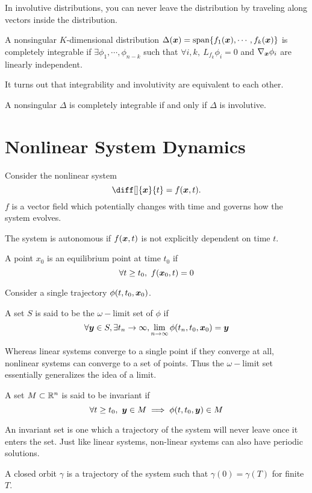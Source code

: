 In involutive distributions, you can never leave the distribution by traveling
along vectors inside the distribution.
\begin{definition}
	A nonsingular $K$-dimensional distribution $\Delta(\boldsymbol{x}) =
	\text{span}\{f_1(\boldsymbol{x}), \cdots, f_k(\boldsymbol{x})\}$ is completely integrable if
	$\exists \phi_1,\cdots,\phi_{n-k}$ such that $\forall i,k,\ L_{f_k}\phi_i = 0$
	and $\nabla_{\boldsymbol{x}}\phi_i$ are linearly independent.
	\label{thm:involutive}
\end{definition}
It turns out that integrability and involutivity are equivalent to each other.
\begin{theorem}
	A nonsingular $\Delta$ is completely integrable if and only if $\Delta$ is
	involutive.
	\label{thm:frobenius}
\end{theorem}
\section{Nonlinear System Dynamics}
Consider the nonlinear system \[
	\diff[]{\bs{x}}{t} = f(\bs{x}, t).
\]
$f$ is a vector field which potentially changes with time and governs how the
system evolves.
\begin{definition}
	The system is autonomous if $f(\boldsymbol{x}, t)$ is not explicitly dependent on time $t$.
	\label{defn:autonomous-system}
\end{definition}
\begin{definition}
	A point $x_0$ is an equilibrium point at time $t_0$ if \[
		\forall t \geq t_0, \ f(\boldsymbol{x}_0, t) = 0 
	\]
	\label{defn:equilibrium-point}
\end{definition}
Consider a single trajectory $\phi(t, t_0, \boldsymbol{x}_0)$.
\begin{definition}
	A set $S$ is said to be the $\omega-$limit set of $\phi$ if\[
		\forall \boldsymbol{y}\in S,\exists t_n\to \infty, \lim_{n\to\infty}\phi(t_n, t_0,
		\boldsymbol{x}_0) = \boldsymbol{y}
	\]
	\label{defn:w-limit-set}
\end{definition}
Whereas linear systems converge to a single point if they converge at all,
nonlinear systems can converge to a set of points. Thus the $\omega-$limit set
essentially generalizes the idea of a limit.
\begin{definition}
	A set $M\subset \mathbb{R}^n$ is said to be invariant if \[
		\forall t\geq t_0,\ \boldsymbol{y}\in M \implies \phi(t, t_0, \boldsymbol{y}) \in M
	\]
	\label{defn:invariant-set}
\end{definition}
An invariant set is one which a trajectory of the system will never leave once it enters the
set. Just like linear systems, non-linear systems can also have periodic solutions.
\begin{definition}
	A closed orbit $\gamma$ is a trajectory of the system such that $\gamma(0) =
	\gamma(T)$ for finite $T$.
	\label{defn:closed-orbit}
\end{definition}

